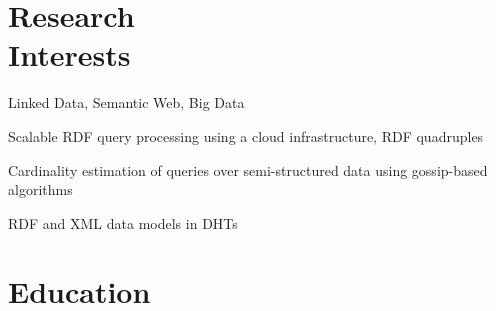 \documentclass[margin,line]{resume}
\begin{document}
\address{
+1-816-255-0338 \ \ \ \ \ vgslavov@umkc.edu \ \ \ \ \ http://v.web.umkc.edu/vsfgd
}
\begin{resume}

%

    \section{\mysidestyle Research\\Interests}
    \begin{list3}
        \item Linked Data, Semantic Web, Big Data
        \item Scalable RDF query processing using a cloud infrastructure, RDF quadruples
        \item Cardinality estimation of queries over semi-structured data using gossip-based algorithms
        \item RDF and XML data models in DHTs
    \end{list3}\vspace{-1.5mm}
   
    \section{\mysidestyle Education}


\end{resume}
\end{document}
